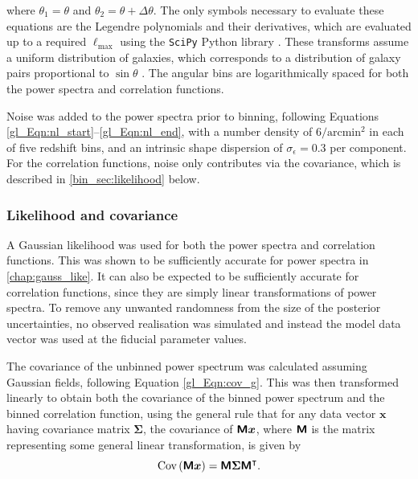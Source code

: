 where $\theta_1 = \theta$ and $\theta_2 = \theta + \Delta \theta$. The only symbols necessary to evaluate these equations are the Legendre polynomials and their derivatives, which are evaluated up to a required $\ell_\text{max}$ using the \texttt{SciPy} Python library \citep{Virtanen2020}. These transforms assume a uniform distribution of galaxies, which corresponds to a distribution of galaxy pairs proportional to $\sin{\theta}$ \citep{Friedrich2021}. The angular bins are logarithmically spaced for both the power spectra and correlation functions.

Noise was added to the power spectra prior to binning, following Equations \eqref{gl_Eqn:nl_start}--\eqref{gl_Eqn:nl_end}, with a number density of $6 / \text{arcmin}^2$ in each of five redshift bins, and an intrinsic shape dispersion of $\sigma_\epsilon = 0.3$ per component. For the correlation functions, noise only contributes via the covariance, which is described in \autoref{bin_sec:likelihood} below.

\subsubsection{Likelihood and covariance}
\label{bin_sec:likelihood}

A Gaussian likelihood was used for both the power spectra and correlation functions. This was shown to be sufficiently accurate for power spectra in \autoref{chap:gauss_like}. It can also be expected to be sufficiently accurate for correlation functions, since they are simply linear transformations of power spectra. To remove any unwanted randomness from the size of the posterior uncertainties, no observed realisation was simulated and instead the model data vector was used at the fiducial parameter values.

The covariance of the unbinned power spectrum was calculated assuming Gaussian fields, following Equation \eqref{gl_Eqn:cov_g}. This was then transformed linearly to obtain both the covariance of the binned power spectrum and the binned correlation function, using the general rule that for any data vector $\bm{x}$ having covariance matrix $\bm{\Sigma}$, the covariance of $\bm{\mathsf{M}} \bm{x}$, where $\bm{\mathsf{M}}$ is the matrix representing some general linear transformation, is given by
\begin{equation}
\text{Cov} \left( \bm{\mathsf{M}} \bm{x} \right)
= \bm{\mathsf{M}} \bm{\Sigma} \bm{\mathsf{M}}^\intercal.
\end{equation}

